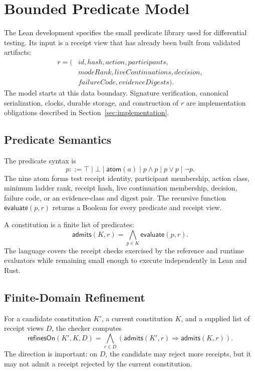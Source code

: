 \section{Bounded Predicate Model}
\label{sec:model}

The Lean development specifies the small predicate library used for
differential testing. Its input is a receipt view that has already been built
from validated artifacts:
\[
\begin{aligned}
r = (&\mathit{id},\mathit{hash},\mathit{action},
      \mathit{participants},\\
     &\mathit{modeRank},\mathit{liveContinuations},
      \mathit{decision},\\
     &\mathit{failureCode},\mathit{evidenceDigests}).
\end{aligned}
\]
The model starts at this data boundary. Signature verification, canonical
serialization, clocks, durable storage, and construction of \(r\) are
implementation obligations described in Section~\ref{sec:implementation}.

\subsection{Predicate Semantics}

The predicate syntax is
\[
 p ::= \top \mid \bot \mid \mathsf{atom}(a)
       \mid p \land p \mid p \lor p \mid \neg p.
\]
The nine atom forms test receipt identity, participant membership, action
class, minimum ladder rank, receipt hash, live continuation membership,
decision, failure code, or an evidence-class and digest pair. The recursive
function \(\mathsf{evaluate}(p,r)\) returns a Boolean for every predicate and
receipt view.

A constitution is a finite list of predicates:
\[
  \mathsf{admits}(K,r)
    = \bigwedge_{p\in K}\mathsf{evaluate}(p,r).
\]
The language covers the receipt checks exercised by the reference and runtime
evaluators while remaining small enough to execute independently in Lean and
Rust.

\subsection{Finite-Domain Refinement}

For a candidate constitution \(K'\), a current constitution \(K\), and a
supplied list of receipt views \(D\), the checker computes
\[
 \mathsf{refinesOn}(K',K,D)
   = \bigwedge_{r\in D}
     \left(\mathsf{admits}(K',r)
       \Rightarrow \mathsf{admits}(K,r)\right).
\]
The direction is important: on \(D\), the candidate may reject more receipts,
but it may not admit a receipt rejected by the current constitution.

